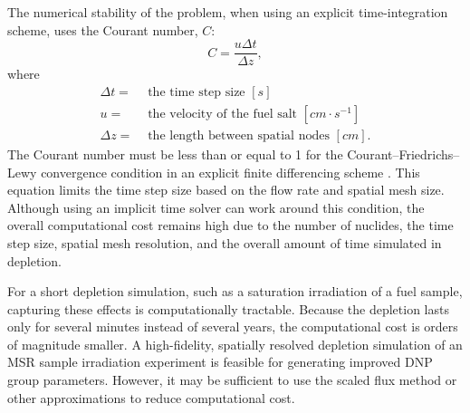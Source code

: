 The numerical stability of the problem, when using an explicit time-integration scheme, uses the Courant number, $C$:
\begin{equation}
    C = \frac{u \Delta t}{\Delta z},
\label{eq:num-stab}
\end{equation}
where
\begin{align}
    \Delta t =& \text{ the time step size $[s]$} \nonumber \\
    u =& \text{ the velocity of the fuel salt $[cm \cdot s^{-1}]$} \nonumber \\
    \Delta z =& \text{ the length between spatial nodes $[cm]$.} \nonumber
\end{align}
The Courant number must be less than or equal to 1 for the Courant–Friedrichs–Lewy convergence condition in an explicit finite differencing scheme \cite{courant1928partiellen}.
This equation limits the time step size based on the flow rate and spatial mesh size.
Although using an implicit time solver can work around this condition, the overall computational cost remains high due to the number of nuclides, the time step size, spatial mesh resolution, and the overall amount of time simulated in depletion.

For a short depletion simulation, such as a saturation irradiation of a fuel sample, capturing these effects is computationally tractable.
Because the depletion lasts only for several minutes instead of several years, the computational cost is orders of magnitude smaller.
A high-fidelity, spatially resolved depletion simulation of an \gls{MSR} sample irradiation experiment is feasible for generating improved \gls{DNP} group parameters.
However, it may be sufficient to use the scaled flux method or other approximations to reduce computational cost.